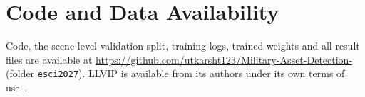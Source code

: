 \documentclass[conference]{IEEEtran}
\begin{document}
\section*{Code and Data Availability}
Code, the scene-level validation split, training logs, trained weights and all result files are available at \url{https://github.com/utkarsht123/Military-Asset-Detection-} (folder \texttt{esci2027}). LLVIP is available from its authors under its own terms of use~\cite{jia2021llvip}.



\end{document}
